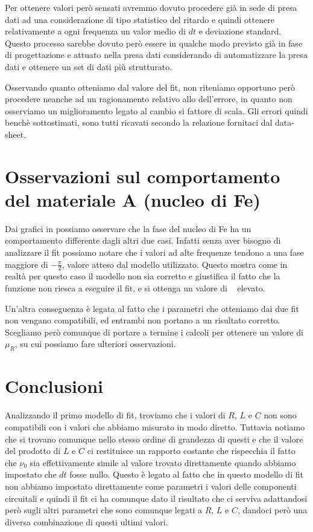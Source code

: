 \documentclass[
    rmp,
    floatfix,
    reprint, 
    superscriptaddress, 
    altaffilletter, 
    amsmath, 
    amssymb, 
    a4paper]{revtex4-2}
\begin{document}
Per ottenere valori però sensati avremmo dovuto procedere già in sede di presa dati ad una considerazione di tipo statistico del ritardo e quindi ottenere relativamente a ogni frequenza un valor medio di $dt$ e deviazione standard. Questo processo sarebbe dovuto però essere in qualche modo previsto già in fase di progettazione e attuato nella presa dati considerando di automatizzare la presa dati e ottenere un set di dati più strutturato. 

Osservando quanto otteniamo dal valore del fit, non riteniamo opportuno però procedere neanche ad un ragionamento relativo allo  dell'errore, in quanto non osserviamo un miglioramento legato al cambio si fattore di scala. Gli errori quindi benchè sottostimati, sono tutti ricavati secondo la relazione fornitaci dal data-sheet.


\section*{Osservazioni sul comportamento del materiale A (nucleo di F\lowercase{e})}
Dai grafici in  possiamo osservare che la fase del nucleo di Fe ha un comportamento differente dagli altri due casi. Infatti senza aver bisogno di analizzare il fit possiamo notare che i valori ad alte frequenze tendono a una fase maggiore di $-\frac{\pi}{2}$, valore atteso dal modello utilizzato. Questo mostra come in realtà per questo caso il modello non sia corretto e giustifica il fatto che la funzione non riesca a eseguire il fit, e si ottenga un valore di \ChiNdf~ elevato. 

Un'altra conseguenza è legata al fatto che i parametri che otteniamo dai due fit non vengano compatibili, ed entrambi non portano a un risultato corretto. Scegliamo però comunque di portare a termine i calcoli per ottenere un valore di $\mu_R$, su cui possiamo fare ulteriori osservazioni. 


\section*{Conclusioni}

Analizzando il primo modello di fit, troviamo che i valori di $R$, $L$ e $C$ non sono compatibili con i valori che abbiamo misurato in modo diretto. Tuttavia notiamo che si trovano comunque nello stesso ordine di grandezza di questi e che il valore del prodotto di $L$ e $C$ ci restituisce un rapporto costante che rispecchia il fatto che $\nu_0$ sia effettivamente simile al valore trovato direttamente quando abbiamo impostato che $dt$ fosse nullo. Questo è legato al fatto che in questo modello di fit non abbiamo impostato direttamente come parametri i valori delle componenti circuitali e quindi il fit ci ha comunque dato il risultato che ci serviva adattandosi però sugli altri parametri che sono comunque legati a $R$, $L$ e $C$, dandoci però una diversa combinazione di questi ultimi valori.
\end{document}
